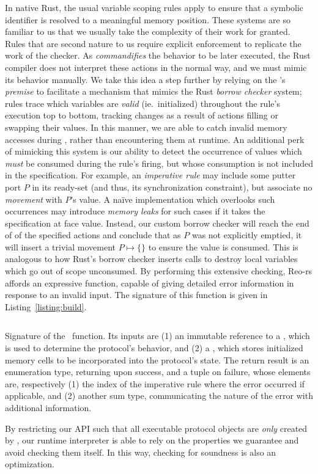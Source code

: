 In native Rust, the usual variable scoping rules apply to ensure that a symbolic identifier is resolved to a meaningful memory position. These systems are so familiar to us that we usually take the complexity of their work for granted. Rules that are second nature to us require explicit enforcement to replicate the work of the checker. As  \textit{commandifies} the behavior to be later executed, the Rust compiler does not interpret these actions in the normal way, and we must mimic its behavior manually. We take this idea a step further by relying on the 's \textit{premise} to facilitate a mechanism that mimics the Rust \textit{borrow checker} system; rules trace which variables are \textit{valid} (ie.\ initialized) throughout the rule's execution top to bottom, tracking changes as a result of actions filling or swapping their values. In this manner, we are able to catch invalid memory accesses during , rather than encountering them at runtime. An additional perk of mimicking this system is our ability to detect the occurrence of values which \textit{must} be consumed during the rule's firing, but whose consumption is not included in the specification. For example, an \textit{imperative rule} may include some putter port $P$ in its ready-set (and thus, its synchronization constraint), but associate no \textit{movement} with $P$'s value. A na\"ive implementation which overlooks such occurrences may introduce \textit{memory leaks} for such cases if it takes the specification at face value. Instead, our custom borrow checker will reach the end of of the specified actions and conclude that as $P$ was not explicitly emptied, it will insert a trivial movement $P\mapsto{} \{\}$ to ensure the value is consumed. This is analogous to how Rust's borrow checker inserts  calls to destroy local variables which go out of scope unconsumed. By performing this extensive checking, Reo-rs affords an expressive  function, capable of giving detailed error information in response to an invalid input. The signature of this function is given in Listing~\ref{listing:build}.


\begin{listing}[ht]
	\centering
	\inputminted[]{rust}{build.rs}
	\caption[TODO.]{Signature of the~ function. Its inputs are (1) an immutable reference to a , which is used to determine the protocol's behavior, and (2) a , which stores initialized memory cells to be incorporated into the protocol's state. The return result is an enumeration type, returning  upon success, and a tuple on failure, whose elements are, respectively (1) the index of the imperative rule where the error occurred if applicable, and (2) another sum type, communicating the nature of the error with additional information. }
	\label{listing:build}
\end{listing}

By restricting our API such that all executable protocol objects are \textit{only} created by , our runtime interpreter is able to rely on the properties we guarantee and avoid checking them itself. In this way, checking for soundness is also an optimization.

